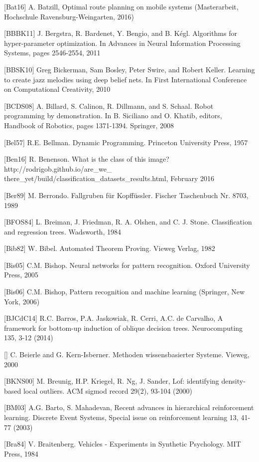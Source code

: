 \documentclass[10pt]{book}
\begin{document}
\begin{center}
[Bat16] A. Batzill, Optimal route planning on mobile systems (Masterarbeit, Hochschule Ravensburg-Weingarten, 2016)

[BBBK11] J. Bergstra, R. Bardenet, Y. Bengio, and B. Kégl. Algorithms for hyper-parameter optimization. In Advances in Neural Information Processing Systems, pages 2546-2554, 2011

[BBSK10] Greg Bickerman, Sam Bosley, Peter Swire, and Robert Keller. Learning to create jazz melodies using deep belief nets. In First International Conference on Computational Creativity, 2010

[BCDS08] A. Billard, S. Calinon, R. Dillmann, and S. Schaal. Robot programming by demonstration. In B. Siciliano and O. Khatib, editors, Handbook of Robotics, pages 1371-1394. Springer, 2008

[Bel57] R.E. Bellman. Dynamic Programming. Princeton University Press, 1957

[Ben16] R. Benenson. What is the class of this image? http://rodrigob.github.io/are\_we\_ there\_yet/build/classification\_datasets\_results.html, February 2016

[Ber89] M. Berrondo. Fallgruben für Kopffüssler. Fischer Taschenbuch Nr. 8703, 1989

[BFOS84] L. Breiman, J. Friedman, R. A. Olshen, and C. J. Stone. Classification and regression trees. Wadsworth, 1984

[Bib82] W. Bibel. Automated Theorem Proving. Vieweg Verlag, 1982

[Bis05] C.M. Bishop. Neural networks for pattern recognition. Oxford University Press, 2005

[Bis06] C.M. Bishop, Pattern recognition and machine learning (Springer, New York, 2006)

[BJCdC14] R.C. Barros, P.A. Jaskowiak, R. Cerri, A.C. de Carvalho, A framework for bottom-up induction of oblique decision trees. Neurocomputing 135, 3-12 (2014)

[\cite{bki00}] C. Beierle and G. Kern-Isberner. Methoden wissensbasierter Systeme. Vieweg, 2000

[BKNS00] M. Breunig, H.P. Kriegel, R. Ng, J. Sander, Lof: identifying density-based local outliers. ACM sigmod record 29(2), 93-104 (2000)

[BM03] A.G. Barto, S. Mahadevan, Recent advances in hierarchical reinforcement learning. Discrete Event Systems, Special issue on reinforcement learning 13, 41-77 (2003)

[Bra84] V. Braitenberg. Vehicles - Experiments in Synthetic Psychology. MIT Press, 1984


\end{center}
\end{document}
